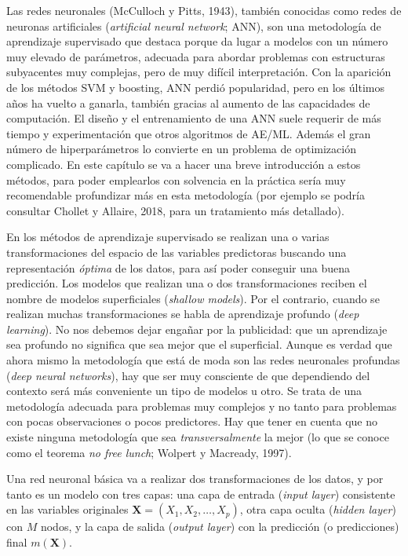 \documentclass[
]{book}
\theoremstyle{break}
\theoremstyle{definition}
\theoremstyle{definition}
\theoremstyle{definition}
\theoremstyle{remark}
\begin{document}
Las redes neuronales (McCulloch y Pitts, 1943), también conocidas como redes de neuronas artificiales (\emph{artificial neural network}; ANN), son una metodología de aprendizaje supervisado que destaca porque da lugar a modelos con un número muy elevado de parámetros, adecuada para abordar problemas con estructuras subyacentes muy complejas, pero de muy difícil interpretación.
Con la aparición de los métodos SVM y boosting, ANN perdió popularidad, pero en los últimos años ha vuelto a ganarla, también gracias al aumento de las capacidades de computación.
El diseño y el entrenamiento de una ANN suele requerir de más tiempo y experimentación que otros algoritmos de AE/ML. Además el gran número de hiperparámetros lo convierte en un problema de optimización complicado.
En este capítulo se va a hacer una breve introducción a estos métodos, para poder emplearlos con solvencia en la práctica sería muy recomendable profundizar más en esta metodología (por ejemplo se podría consultar Chollet y Allaire, 2018, para un tratamiento más detallado).

En los métodos de aprendizaje supervisado se realizan una o varias transformaciones del espacio de las variables predictoras buscando una representación \emph{óptima} de los datos, para así poder conseguir una buena predicción. Los modelos que realizan una o dos transformaciones reciben el nombre de modelos superficiales (\emph{shallow models}). Por el contrario, cuando se realizan muchas transformaciones se habla de aprendizaje profundo (\emph{deep learning}). No nos debemos dejar engañar por la publicidad: que un aprendizaje sea profundo no significa que sea mejor que el superficial. Aunque es verdad que ahora mismo la metodología que está de moda son las redes neuronales profundas (\emph{deep neural networks}), hay que ser muy consciente de que dependiendo del contexto será más conveniente un tipo de modelos u otro. Se trata de una metodología adecuada para problemas muy complejos y no tanto para problemas con pocas observaciones o pocos predictores. Hay que tener en cuenta que no existe ninguna metodología que sea \emph{transversalmente} la mejor (lo que se conoce como el teorema \emph{no free lunch}; Wolpert y Macready, 1997).

Una red neuronal básica va a realizar dos transformaciones de los datos, y por tanto es un modelo con tres capas: una capa de entrada (\emph{input layer}) consistente en las variables originales \(\mathbf{X} = (X_1,X_2,\ldots, X_p)\), otra capa oculta (\emph{hidden layer}) con \(M\) nodos, y la capa de salida (\emph{output layer}) con la predicción (o predicciones) final \(m(\mathbf{X})\).
\end{document}
